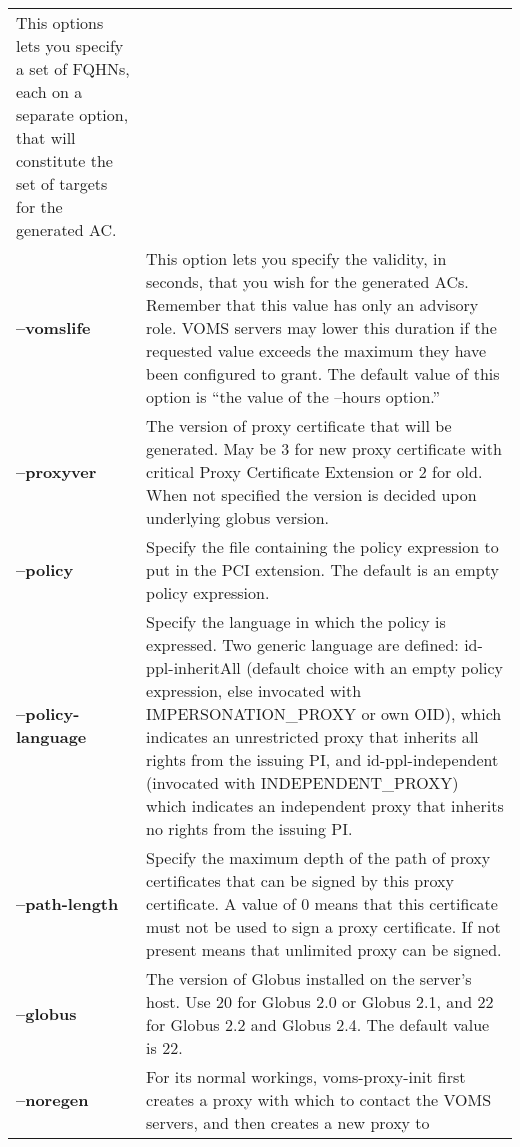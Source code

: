 \documentclass[a4paper]{book}
\begin{document}
\begin{longtable}{lp{3in}}
		      This options lets you specify a set of FQHNs,
		      each on a separate option, that will constitute
		      the set of targets for the generated AC.\\
\textbf{--vomslife} & This option lets you specify the validity, in
		      seconds, that you wish for the generated ACs.
		      Remember that this value has only an advisory
		      role.  VOMS servers may lower this duration if
		      the requested value exceeds the maximum they
		      have been configured to grant.  The default
		      value of this option is ``the value of the
		      --hours option.''\\
\textbf{--proxyver}  & The version of proxy certificate that will be generated.
                       May be 3 for new proxy certificate with critical 
                       Proxy Certificate Extension or 2 for old. When not specified
                       the version is decided upon underlying globus version.\\
\textbf{--policy}    & Specify the file containing the policy expression to put in
                       the PCI extension. The default is an empty policy expression.\\
\textbf{--policy-language} & Specify the language in which the policy is expressed. 
                             Two generic language are defined: id-ppl-inheritAll 
			     (default choice with an empty policy expression,
			     else invocated with IMPERSONATION\_PROXY or own OID), 
			     which indicates an unrestricted proxy that inherits all
			     rights from the issuing PI, and id-ppl-independent
                             (invocated with INDEPENDENT\_PROXY) which indicates an independent proxy that inherits no
			     rights from the issuing PI. \\
\textbf{--path-length}  & Specify the maximum depth of the path of proxy certificates
                          that can be signed by this proxy certificate.
			  A value of 0 means that this certificate must not be used to
			  sign a proxy certificate. If not present means that unlimited proxy can be signed.\\
\textbf{--globus}   & The version of Globus installed on the server's
		      host. Use 20 for Globus 2.0 or Globus 2.1, and
		      22 for Globus 2.2 and Globus 2.4.  The default
		      value is 22.\\  
\textbf{--noregen}  & For its normal workings, voms-proxy-init
		      first creates a proxy with which to contact the
		      VOMS servers, and then creates a new proxy to

\end{longtable}
\end{document}
